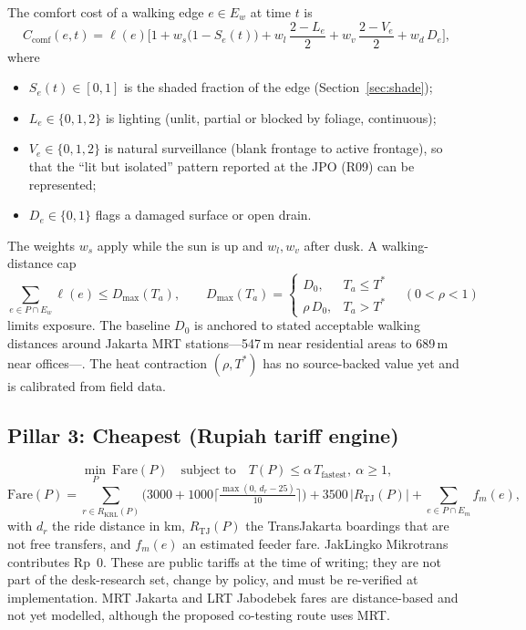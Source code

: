\documentclass[11pt,a4paper]{article}
\begin{document}
The comfort cost of a walking edge $e\in E_w$ at time $t$ is
\begin{equation}
  C_{\mathrm{comf}}(e,t)=\ell(e)\Big[1+w_s\big(1-S_e(t)\big)+w_l\,\frac{2-L_e}{2}
   +w_v\,\frac{2-V_e}{2}+w_d\,D_e\Big],
  \label{eq:comfort}
\end{equation}
where
\begin{itemize}
  \item $S_e(t)\in[0,1]$ is the shaded fraction of the edge (Section~\ref{sec:shade});
  \item $L_e\in\{0,1,2\}$ is lighting (unlit, partial or blocked by foliage, continuous);
  \item $V_e\in\{0,1,2\}$ is natural surveillance (blank frontage to active frontage), so that the
    ``lit but isolated'' pattern reported at the JPO (R09) can be represented;
  \item $D_e\in\{0,1\}$ flags a damaged surface or open drain.
\end{itemize}
The weights $w_s$ apply while the sun is up and $w_l,w_v$ after dusk. A walking-distance cap
\begin{equation}
  \sum_{e\in P\cap E_w}\ell(e)\le D_{\max}(T_a),\qquad
  D_{\max}(T_a)=\begin{cases}D_0,& T_a\le T^{*}\\ \rho\,D_0,& T_a>T^{*}\end{cases}\quad(0<\rho<1)
  \label{eq:cap}
\end{equation}
limits exposure. The baseline $D_0$ is anchored to stated acceptable walking distances around
Jakarta MRT stations---547\,m near residential areas to 689\,m near offices---\cite{afkara2020walking}.
The heat contraction $(\rho,T^{*})$ has no source-backed value yet and is calibrated from field data.

\subsection{Pillar 3: Cheapest (Rupiah tariff engine)}

\begin{equation}
  \min_{P}\ \mathrm{Fare}(P)\quad\text{subject to}\quad T(P)\le\alpha\,T_{\mathrm{fastest}},\ \alpha\ge1,
  \label{eq:cheapest}
\end{equation}
\begin{equation}
  \mathrm{Fare}(P)=\sum_{r\in R_{\mathrm{KRL}}(P)}\Big(3000+1000\Big\lceil\tfrac{\max(0,\,d_r-25)}{10}\Big\rceil\Big)
   +3500\,\lvert R_{\mathrm{TJ}}(P)\rvert+\sum_{e\in P\cap E_m}f_m(e),
  \label{eq:fare}
\end{equation}
with $d_r$ the ride distance in km, $R_{\mathrm{TJ}}(P)$ the TransJakarta boardings that are not
free transfers, and $f_m(e)$ an estimated feeder fare. JakLingko Mikrotrans contributes Rp~0.
These are public tariffs at the time of writing; they are not part of the desk-research set,
change by policy, and must be re-verified at implementation. MRT Jakarta and LRT Jabodebek fares are
distance-based and not yet modelled, although the proposed co-testing route uses MRT.
\end{document}

